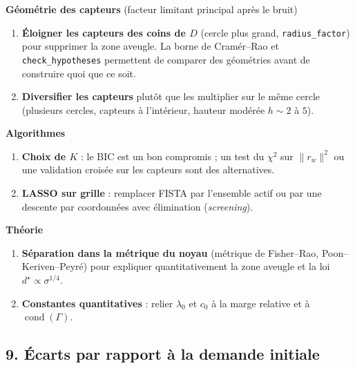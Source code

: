 \documentclass[
  french,
]{article}
\providecommand{\tightlist}{%
  \setlength{\itemsep}{0pt}\setlength{\parskip}{0pt}}
\begin{document}
\textbf{Géométrie des capteurs} (facteur limitant principal après le
bruit)

\begin{enumerate}
\def\labelenumi{\arabic{enumi}.}
\setcounter{enumi}{3}
\tightlist
\item
  \textbf{Éloigner les capteurs des coins de \(D\)} (cercle plus grand,
  \texttt{radius\_factor}) pour supprimer la zone aveugle. La borne de
  Cramér--Rao et \texttt{check\_hypotheses} permettent de comparer des
  géométries avant de construire quoi que ce soit.
\item
  \textbf{Diversifier les capteurs} plutôt que les multiplier sur le
  même cercle (plusieurs cercles, capteurs à l'intérieur, hauteur
  modérée \(h\sim 2\) à \(5\)).
\end{enumerate}

\textbf{Algorithmes}

\begin{enumerate}
\def\labelenumi{\arabic{enumi}.}
\setcounter{enumi}{5}
\tightlist
\item
  \textbf{Choix de \(K\)} : le BIC est un bon compromis ; un test du
  \(\chi^2\) sur \(\lVert r_w\rVert^2\) ou une validation croisée sur
  les capteurs sont des alternatives.
\item
  \textbf{LASSO sur grille} : remplacer FISTA par l'ensemble actif ou
  par une descente par coordonnées avec élimination (\emph{screening}).
\end{enumerate}

\textbf{Théorie}

\begin{enumerate}
\def\labelenumi{\arabic{enumi}.}
\setcounter{enumi}{7}
\tightlist
\item
  \textbf{Séparation dans la métrique du noyau} (métrique de
  Fisher--Rao, Poon--Keriven--Peyré) pour expliquer quantitativement la
  zone aveugle et la loi \(d^{\star}\propto\sigma^{1/4}\).
\item
  \textbf{Constantes quantitatives} : relier \(\lambda_0\) et \(c_0\) à
  la marge relative et à \(\operatorname{cond}(\Gamma)\).
\end{enumerate}

\subsection{9. Écarts par rapport à la demande
initiale}\label{uxe9carts-par-rapport-uxe0-la-demande-initiale}
\end{document}
